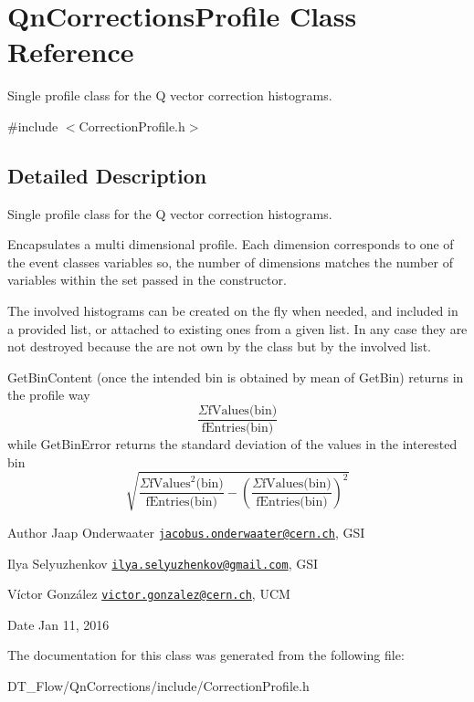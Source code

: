 \hypertarget{classQnCorrectionsProfile}{}\section{Qn\+Corrections\+Profile Class Reference}
\label{classQnCorrectionsProfile}


Single profile class for the Q vector correction histograms.  




{\ttfamily \#include $<$Correction\+Profile.\+h$>$}



\subsection{Detailed Description}
Single profile class for the Q vector correction histograms. 

Encapsulates a multi dimensional profile. Each dimension corresponds to one of the event classes variables so, the number of dimensions matches the number of variables within the set passed in the constructor.

The involved histograms can be created on the fly when needed, and included in a provided list, or attached to existing ones from a given list. In any case they are not destroyed because the are not own by the class but by the involved list.

Get\+Bin\+Content (once the intended bin is obtained by mean of Get\+Bin) returns in the profile way \[ \frac{\Sigma \mbox{fValues(bin)}}{\mbox{fEntries(bin)}} \] while Get\+Bin\+Error returns the standard deviation of the values in the interested bin \[ \sqrt{\frac{\Sigma \mbox{fValues}^2\mbox{(bin)}}{\mbox{fEntries(bin)}} - \left(\frac{\Sigma \mbox{fValues(bin)}}{\mbox{fEntries(bin)}}\right)^2} \]

\begin{DoxyAuthor}{Author}
Jaap Onderwaater \href{mailto:jacobus.onderwaater@cern.ch}{\tt jacobus.\+onderwaater@cern.\+ch}, G\+SI 

Ilya Selyuzhenkov \href{mailto:ilya.selyuzhenkov@gmail.com}{\tt ilya.\+selyuzhenkov@gmail.\+com}, G\+SI 

Víctor González \href{mailto:victor.gonzalez@cern.ch}{\tt victor.\+gonzalez@cern.\+ch}, U\+CM 
\end{DoxyAuthor}
\begin{DoxyDate}{Date}
Jan 11, 2016 
\end{DoxyDate}


The documentation for this class was generated from the following file\+:\begin{DoxyCompactItemize}
\item 
D\+T\+\_\+\+Flow/\+Qn\+Corrections/include/Correction\+Profile.\+h\end{DoxyCompactItemize}
